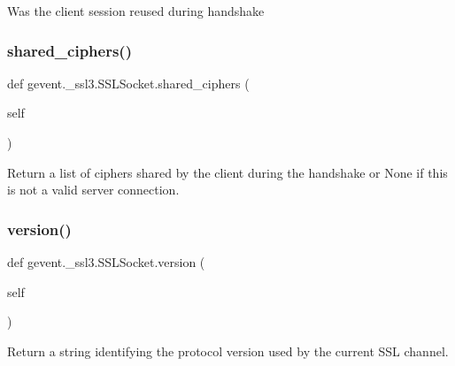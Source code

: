 \begin{DoxyVerb}Was the client session reused during handshake\end{DoxyVerb}
 \mbox{\label{classgevent_1_1__ssl3_1_1_s_s_l_socket_a30fd5079ec79337882629034e775be5d}} 
\subsubsection{\texorpdfstring{shared\+\_\+ciphers()}{shared\_ciphers()}}
{\footnotesize\ttfamily def gevent.\+\_\+ssl3.\+S\+S\+L\+Socket.\+shared\+\_\+ciphers (\begin{DoxyParamCaption}\item[{}]{self }\end{DoxyParamCaption})}

\begin{DoxyVerb}Return a list of ciphers shared by the client during the handshake or
None if this is not a valid server connection.
\end{DoxyVerb}
 \mbox{\label{classgevent_1_1__ssl3_1_1_s_s_l_socket_ace26ef6392770a2b4e60cabeb22b89f3}} 
\subsubsection{\texorpdfstring{version()}{version()}}
{\footnotesize\ttfamily def gevent.\+\_\+ssl3.\+S\+S\+L\+Socket.\+version (\begin{DoxyParamCaption}\item[{}]{self }\end{DoxyParamCaption})}

\begin{DoxyVerb}Return a string identifying the protocol version used by the
current SSL channel. \end{DoxyVerb}
 \mbox{\label{classgevent_1_1__ssl3_1_1_s_s_l_socket_a200a4e1f5db77b2c6d67b6a97186b1a6}} 
